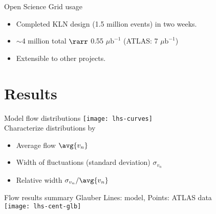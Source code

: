 \documentclass{beamer}
\begin{document}
\begin{frame}{Open Science Grid usage}
  \begin{center}
    \small
  \end{center}

  \vspace{-1em}

  \begin{itemize}
    \item Completed KLN design (1.5 million events) in two weeks.
    \item ${\sim}$4 million total $\rarr$ 0.55 $\mu\text{b}^{-1}$  (ATLAS:  7 $\mu\text{b}^{-1}$)
    \item Extensible to other projects.
  \end{itemize}
\end{frame}



\section{Results}


\begin{frame}[label=curves]{Model flow distributions}
  \vspace{2ex}
  \texttt{[image: lhs-curves]} \\

  Characterize distributions by
  \begin{itemize}
    \item Average flow $\avg{v_n}$
    \item Width of fluctuations (standard deviation) $\sigma_{v_n}$
    \item Relative width $\sigma_{v_n} / \avg{v_n}$
  \end{itemize}
\end{frame}



\begin{frame}{Flow results summary}
  \vspace{2ex}
  \centering
  \hspace{.46\textwidth}
  Glauber
  \hfill\tiny Lines: model, Points: ATLAS data \normalsize \\[.5ex]
  \texttt{[image: lhs-cent-glb]}
\end{frame}
\end{document}
